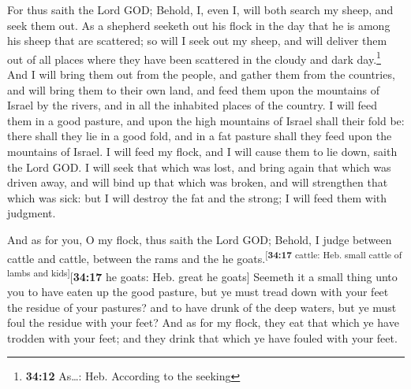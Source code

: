  For thus saith the Lord GOD; Behold, I, even I, will
both search my sheep, and seek them out.  As a shepherd
seeketh out his flock in the day that he is among his sheep that are
scattered; so will I seek out my sheep, and will deliver them out of all
places where they have been scattered in the cloudy and dark
day.\footnote{\textbf{34:12} As\ldots: Heb. According to the seeking}
 And I will bring them out from the people, and gather
them from the countries, and will bring them to their own land, and feed
them upon the mountains of Israel by the rivers, and in all the
inhabited places of the country.  I will feed them in a
good pasture, and upon the high mountains of Israel shall their fold be:
there shall they lie in a good fold, and in a fat pasture shall they
feed upon the mountains of Israel.  I will feed my flock,
and I will cause them to lie down, saith the Lord GOD.  I
will seek that which was lost, and bring again that which was driven
away, and will bind up that which was broken, and will strengthen that
which was sick: but I will destroy the fat and the strong; I will feed
them with judgment.

 And as for you, O my flock, thus saith the Lord GOD;
Behold, I judge between cattle and cattle, between the rams and the he
goats.\textsuperscript{{[}\textbf{34:17} cattle: Heb. small cattle of
lambs and kids{]}}{[}\textbf{34:17} he goats: Heb. great he goats{]}
 Seemeth it a small thing unto you to have eaten up the
good pasture, but ye must tread down with your feet the residue of your
pastures? and to have drunk of the deep waters, but ye must foul the
residue with your feet?  And as for my flock, they eat
that which ye have trodden with your feet; and they drink that which ye
have fouled with your feet.


